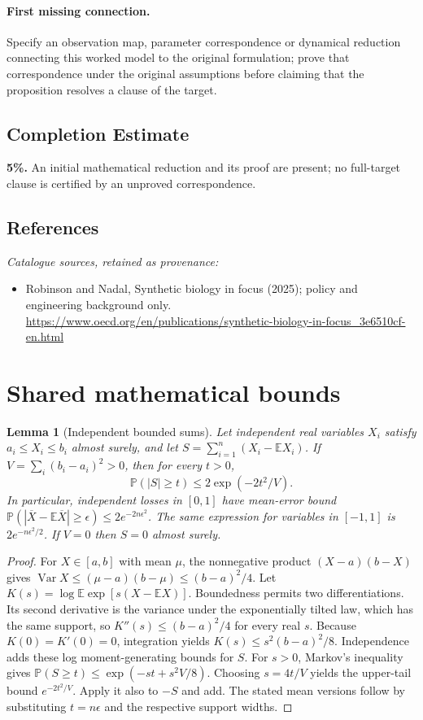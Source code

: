 \documentclass[11pt]{article}
\newcommand{\E}{\mathbb E}
\newcommand{\Prob}{\mathbb P}
\DeclareMathOperator{\Var}{Var}
\providecommand{\E}{\mathbb E}
\providecommand{\Prob}{\mathbb P}
\providecommand{\Var}{\operatorname{Var}}
\newtheorem{sharedlemma}{Lemma}[section]
\begin{document}
\paragraph{First missing connection.} Specify an observation map, parameter correspondence or dynamical reduction connecting this worked model to the original formulation; prove that correspondence under the original assumptions before claiming that the proposition resolves a clause of the target.
\subsection{Completion Estimate}
\textbf{5\%.} An initial mathematical reduction and its proof are present; no full-target clause is certified by an unproved correspondence.
\subsection{References}
\noindent\emph{Catalogue sources, retained as provenance:}
\begin{itemize}
\item Robinson and Nadal, Synthetic biology in focus (2025); policy and engineering background only. \url{https://www.oecd.org/en/publications/synthetic-biology-in-focus_3e6510cf-en.html}
\end{itemize}
\clearpage


\appendix
\section{Shared mathematical bounds}\label{app:bounds}
\begin{sharedlemma}[Independent bounded sums]\label{lem:bounded}
Let independent real variables $X_i$ satisfy $a_i\leq X_i\leq b_i$ almost surely,
and let $S=\sum_{i=1}^n(X_i-\E X_i)$. If
$V=\sum_i(b_i-a_i)^2>0$, then for every $t>0$,
\[
 \Prob(|S|\geq t)\leq 2\exp(-2t^2/V).
\]
In particular, independent losses in $[0,1]$ have mean-error bound
$\Prob(|\overline X-\E\overline X|\geq\epsilon)
\leq2e^{-2n\epsilon^2}$. The same expression for variables in $[-1,1]$
is $2e^{-n\epsilon^2/2}$. If $V=0$ then $S=0$ almost surely.
\end{sharedlemma}
\begin{proof}
For $X\in[a,b]$ with mean $\mu$, the nonnegative product
$(X-a)(b-X)$ gives
$\Var X\leq(\mu-a)(b-\mu)\leq(b-a)^2/4$.
Let $K(s)=\log\E\exp[s(X-\E X)]$.
Boundedness permits two differentiations. Its second derivative is the variance
under the exponentially tilted law, which has the same support, so
$K''(s)\leq(b-a)^2/4$ for every real $s$.
Because $K(0)=K'(0)=0$, integration yields
$K(s)\leq s^2(b-a)^2/8$.
Independence adds these log moment-generating bounds for $S$.
For $s>0$, Markov's inequality gives
$\Prob(S\geq t)\leq\exp(-st+s^2V/8)$.
Choosing $s=4t/V$ yields the upper-tail bound $e^{-2t^2/V}$.
Apply it also to $-S$ and add. The stated mean versions follow by substituting
$t=n\epsilon$ and the respective support widths.
\end{proof}
\end{document}
